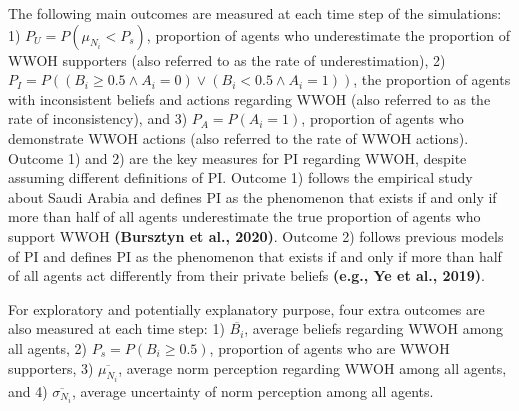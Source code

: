 \documentclass[
  11pt,
]{article}
\begin{document}
The following main outcomes are measured at each time step of the
simulations: 1) \(P_U = P(\mu_{N_i} < P_s)\), proportion of agents who
underestimate the proportion of WWOH supporters (also referred to as the
rate of underestimation), 2)
\(P_I = P((B_i \ge 0.5 \wedge A_i = 0) \vee (B_i < 0.5 \wedge A_i = 1))\),
the proportion of agents with inconsistent beliefs and actions regarding
WWOH (also referred to as the rate of inconsistency), and 3)
\(P_A = P(A_i = 1)\), proportion of agents who demonstrate WWOH actions
(also referred to the rate of WWOH actions). Outcome 1) and 2) are the
key measures for PI regarding WWOH, despite assuming different
definitions of PI. Outcome 1) follows the empirical study about Saudi
Arabia and defines PI as the phenomenon that exists if and only if more
than half of all agents underestimate the true proportion of agents who
support WWOH \textbf{(Bursztyn et al., 2020)}. Outcome 2) follows
previous models of PI and defines PI as the phenomenon that exists if
and only if more than half of all agents act differently from their
private beliefs \textbf{(e.g., Ye et al., 2019)}.

For exploratory and potentially explanatory purpose, four extra outcomes
are also measured at each time step: 1) \(\overline{B_i}\), average
beliefs regarding WWOH among all agents, 2) \(P_s = P(B_i \ge 0.5)\),
proportion of agents who are WWOH supporters, 3)
\(\overline{\mu_{N_i}}\), average norm perception regarding WWOH among
all agents, and 4) \(\overline{\sigma_{N_i}}\), average uncertainty of
norm perception among all agents.

\newpage
\end{document}
